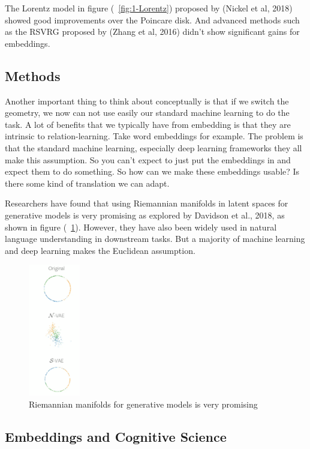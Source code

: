 The Lorentz model in figure (~\ref{fig:1-Lorentz}) proposed by (Nickel et al, 2018) showed good improvements over the Poincare disk. And advanced methods such as the RSVRG proposed by (Zhang et al, 2016) didn't show significant gains for embeddings.  

\subsection{Methods}

Another important thing to think about conceptually is that if we switch the geometry, we now can not use easily our standard machine learning to do the task. A lot of benefits that we typically have from embedding is that they are intrinsic to relation-learning. Take word embeddings for example. The problem is that the standard machine learning, especially deep learning frameworks they all make this assumption. So you can't expect to just put the embeddings in and expect them to do something. So how can we make these embeddings usable? Is there some kind of translation we can adapt.

Researchers have found that using Riemannian manifolds in latent spaces for generative models is very promising as explored by Davidson et al., 2018, as shown in figure (~\ref{fig:2-Davidson}). However, they have also been widely used in natural language understanding in downstream tasks. But a majority of machine learning and deep learning makes the Euclidean assumption.

\begin{figure}[htb]
  \centering
    \includegraphics[width=0.2\textwidth]{lectures/11-b/Images/2-Davidson.png}
    \caption{Riemannian manifolds for generative models is very promising}
    \label{fig:2-Davidson}
\end{figure}

\subsection{Embeddings and Cognitive Science}

